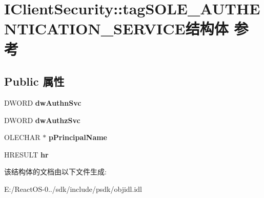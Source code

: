 \hypertarget{struct_i_client_security_1_1tag_s_o_l_e___a_u_t_h_e_n_t_i_c_a_t_i_o_n___s_e_r_v_i_c_e}{}\section{I\+Client\+Security\+:\+:tag\+S\+O\+L\+E\+\_\+\+A\+U\+T\+H\+E\+N\+T\+I\+C\+A\+T\+I\+O\+N\+\_\+\+S\+E\+R\+V\+I\+C\+E结构体 参考}
\label{struct_i_client_security_1_1tag_s_o_l_e___a_u_t_h_e_n_t_i_c_a_t_i_o_n___s_e_r_v_i_c_e}
\subsection*{Public 属性}
\begin{DoxyCompactItemize}
\item 
\mbox{\label{struct_i_client_security_1_1tag_s_o_l_e___a_u_t_h_e_n_t_i_c_a_t_i_o_n___s_e_r_v_i_c_e_a43e47efd1bec5a41ab45a338e33e8190}} 
D\+W\+O\+RD {\bfseries dw\+Authn\+Svc}
\item 
\mbox{\label{struct_i_client_security_1_1tag_s_o_l_e___a_u_t_h_e_n_t_i_c_a_t_i_o_n___s_e_r_v_i_c_e_aae42300210984e38bf8f2bec9a52b4ba}} 
D\+W\+O\+RD {\bfseries dw\+Authz\+Svc}
\item 
\mbox{\label{struct_i_client_security_1_1tag_s_o_l_e___a_u_t_h_e_n_t_i_c_a_t_i_o_n___s_e_r_v_i_c_e_ade9cdd14a419de5ac3e27caa9a3b2a26}} 
O\+L\+E\+C\+H\+AR $\ast$ {\bfseries p\+Principal\+Name}
\item 
\mbox{\label{struct_i_client_security_1_1tag_s_o_l_e___a_u_t_h_e_n_t_i_c_a_t_i_o_n___s_e_r_v_i_c_e_a4d61c7f3f3db305bbeea4b4cac781592}} 
H\+R\+E\+S\+U\+LT {\bfseries hr}
\end{DoxyCompactItemize}


该结构体的文档由以下文件生成\+:\begin{DoxyCompactItemize}
\item 
E\+:/\+React\+O\+S-\/0../sdk/include/psdk/objidl.\+idl\end{DoxyCompactItemize}
